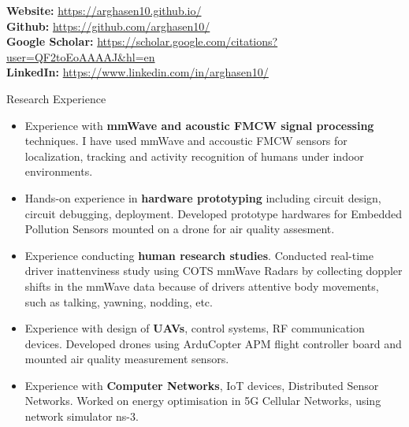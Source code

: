 \documentclass{resume} %
\begin{document}
	
	
	\textbf{Website:} \url{https://arghasen10.github.io/} \\
	\textbf{Github:} \url{https://github.com/arghasen10/} \\
	\textbf{Google Scholar:} \url{https://scholar.google.com/citations?user=QF2toEoAAAAJ&hl=en} \\
	\textbf{LinkedIn:} \url{https://www.linkedin.com/in/arghasen10/} \\
	
	\begin{rSection}{Research Experience}
		\begin{itemize}
			\item Experience with \textbf{mmWave and acoustic FMCW signal processing} techniques. I have used mmWave and accoustic FMCW sensors for localization, tracking and activity recognition of humans under indoor environments.
			\item Hands-on experience in \textbf{hardware prototyping} including circuit design, circuit debugging, deployment. Developed prototype hardwares for Embedded Pollution Sensors mounted on a drone for air quality assesment.
			\item Experience conducting \textbf{human research studies}. Conducted real-time driver inattenviness study using COTS mmWave Radars by collecting doppler shifts in the mmWave data because of drivers attentive body movements, such as talking, yawning, nodding, etc.
			\item Experience with design of \textbf{UAVs}, control systems, RF communication devices. Developed drones using ArduCopter APM flight controller board and mounted air quality measurement sensors.
			\item Experience with \textbf{Computer Networks}, IoT devices, Distributed Sensor Networks. Worked on energy optimisation in 5G Cellular Networks, using network simulator ns-3.
		\end{itemize}
		
		
	\end{rSection}
	
\end{document}
